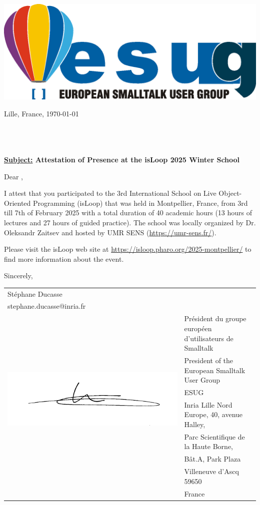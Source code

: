 \documentclass[parskip=full*,fontsize=10pt,BCOR=0pt,DIV=15]{scrreprt}
\begin{document}
\begin{center}
  \includegraphics[width=.4\textwidth]{esug-logo}
\end{center}

\begin{flushright}
  Lille, France, \today
\end{flushright}

\fullname\\
\\
\\

\textbf{\underline{Subject:}  Attestation of Presence at the isLoop 2025 Winter School}

Dear \fullname{},

I attest that you participated to the 3rd International School on Live Object-Oriented Programming (isLoop) that was held in Montpellier, France, from 3rd till 7th of February 2025 with a total duration of 40 academic hours (13 hours of lectures and 27 hours of guided practice). The school was locally organized by Dr. Oleksandr Zaitsev and hosted by UMR SENS (\url{https://umr-sens.fr/}).

Please visit the isLoop web site at \url{https://isloop.pharo.org/2025-montpellier/} to find more information about the event.

Sincerely,


\begin{tabular}{ll}
  St\'ephane Ducasse & \\
  stephane.ducasse@inria.fr&\\
  \multirow{7}{.5\textwidth}{\includegraphics[width=.5\textwidth]{signature}} & Pr\'esident du groupe europ\'een d'utilisateurs de Smalltalk \\
& President of  the European Smalltalk User Group\\
&  ESUG \\
&  Inria Lille Nord Europe, 40, avenue Halley,\\
&  Parc Scientifique de la Haute Borne,\\
&   Bât.A, Park Plaza\\
&  Villeneuve d'Ascq  59650\\
&  France
\end{tabular}
\end{document}
